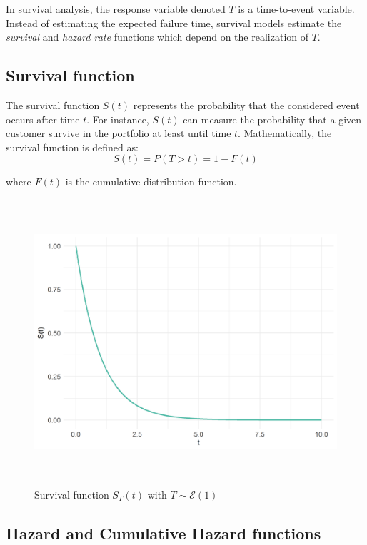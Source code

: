 \documentclass[
]{book}
\begin{document}
In survival analysis, the response variable denoted \(T\) is a time-to-event variable. Instead of estimating the expected failure time, survival models estimate the \emph{survival} and \emph{hazard rate} functions which depend on the realization of \(T\).

\hypertarget{survival-function}{%
\subsection{Survival function}\label{survival-function}}

The survival function \(S(t)\) represents the probability that the considered event occurs after time \(t\). For instance, \(S(t)\) can measure the probability that a given customer survive in the portfolio at least until time \(t\). Mathematically, the survival function is defined as:
\begin{equation}
  S(t) = P(T > t) = 1 - F(t)
  \label{eq:survfun}
\end{equation}

where \(F(t)\) is the cumulative distribution function.

\begin{figure}

{\centering \includegraphics[width=400pt,height=300pt]{./imgs/surv_fun_plot} 

}

\caption{Survival function $S_T(t)$ with $T \sim \mathcal{E} (1)$}\label{fig:survfunplot}
\end{figure}

\hypertarget{hazard-and-cumulative-hazard-functions}{%
\subsection{Hazard and Cumulative Hazard functions}\label{hazard-and-cumulative-hazard-functions}}
\end{document}
